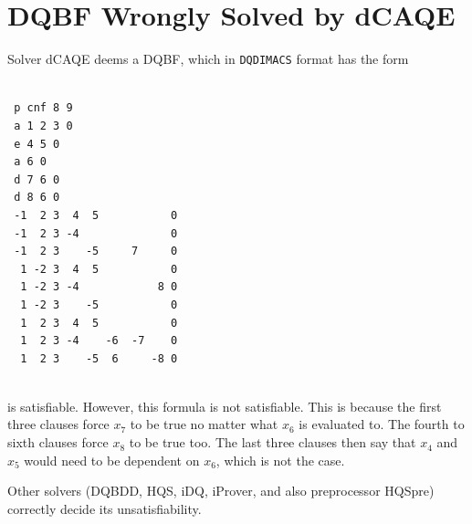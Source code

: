 \documentclass[
  digital, %
  color,
  twoside, %
  table,   %
  nolof,     %
  nolot,     %
]{fithesis3}
\theoremstyle{definition}
\theoremstyle{remark}
\newcommand{\DQDIMACS}[0]{\texttt{DQDIMACS}}
\begin{document}
\chapter{DQBF Wrongly Solved by dCAQE}
\label{appendix:wrongdcaqe}
Solver dCAQE deems a DQBF, which in \DQDIMACS{} format has the form
\begin{verbatim}

 p cnf 8 9
 a 1 2 3 0
 e 4 5 0
 a 6 0
 d 7 6 0
 d 8 6 0
 -1  2 3  4  5           0
 -1  2 3 -4              0
 -1  2 3    -5     7     0
  1 -2 3  4  5           0
  1 -2 3 -4            8 0
  1 -2 3    -5           0
  1  2 3  4  5           0
  1  2 3 -4    -6  -7    0
  1  2 3    -5  6     -8 0
 
\end{verbatim}
is satisfiable. However, this formula is not satisfiable. This is because the first three clauses force $x_7$ to be true no matter what $x_6$ is evaluated to. The fourth to sixth clauses force $x_8$ to be true too. The last three clauses then say that $x_4$ and $x_5$ would need to be dependent on $x_6$, which is not the case.

Other solvers (DQBDD, HQS, iDQ, iProver, and also preprocessor HQSpre) correctly decide its unsatisfiability.
\end{document}
